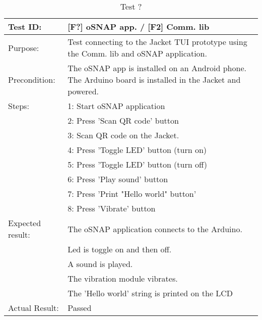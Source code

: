 \begin{table}[h!]
\begin{tabular}{|l|p{10cm}|}
\hline Test ID: &		[F?] oSNAP app. / [F2] Comm. lib \\
\hline Purpose: &		Test connecting to the Jacket TUI prototype using the
						Comm. lib and oSNAP application. \\
\hline Precondition: &	The oSNAP app is installed on an Android phone. The
						Arduino board is installed in the Jacket and powered. \\
\hline
Steps:
 & 1: Start oSNAP application \\
 & 2: Press 'Scan QR code' button \\
 & 3: Scan QR code on the Jacket. \\
 & 4: Press 'Toggle LED' button (turn on) \\
 & 5: Press 'Toggle LED' button (turn off) \\
 & 6: Press 'Play sound' button \\
 & 7: Press 'Print "Hello world" button' \\
 & 8: Press 'Vibrate' button \\
\hline
Expected result:
 & The oSNAP application connects to the Arduino. \\
 & Led is toggle on and then off. \\
 & A sound is played. \\
 & The vibration module vibrates. \\
 & The 'Hello world' string is printed on the LCD \\
\hline
Actual Result:
 & Passed \\
\hline
\end{tabular}
\caption{Test ?}
\end{table}

